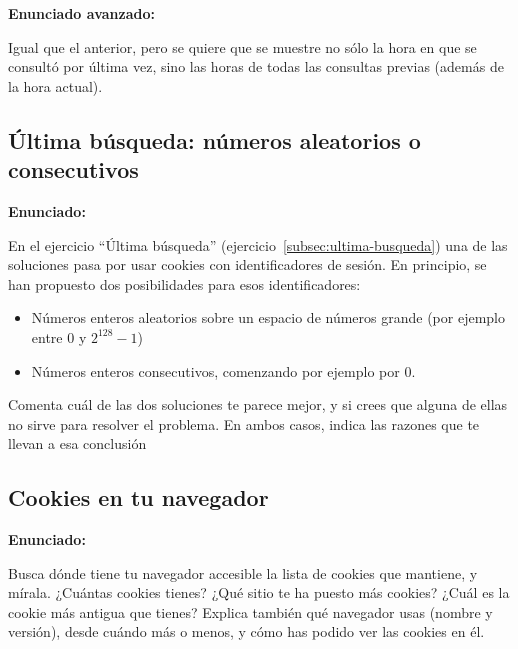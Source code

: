 \textbf{Enunciado avanzado:}

Igual que el anterior, pero se quiere que se muestre no sólo la hora en que se consultó por última vez, sino las horas de todas las consultas previas (además de la hora actual).

\subsection{Última búsqueda: números aleatorios o consecutivos}
\label{subsec:ultima-busqueda-aleconsec}

\textbf{Enunciado:}

En el ejercicio ``Última búsqueda'' (ejercicio~\ref{subsec:ultima-busqueda}) una de las soluciones pasa por usar cookies con identificadores de sesión. En principio, se han propuesto dos posibilidades para esos identificadores:

\begin{itemize}
\item Números enteros aleatorios sobre un espacio de números grande (por ejemplo entre 0 y $2^{128}-1$)
\item Números enteros consecutivos, comenzando por ejemplo por 0.
\end{itemize}

Comenta cuál de las dos soluciones te parece mejor, y si crees que alguna de ellas no sirve para resolver el problema. En ambos casos, indica las razones que te llevan a esa conclusión


\subsection{Cookies en tu navegador}
\label{subsec:cookies-navegador}

\textbf{Enunciado:}

Busca dónde tiene tu navegador accesible la lista de cookies que mantiene, y mírala. ¿Cuántas cookies tienes? ¿Qué sitio te ha puesto más cookies? ¿Cuál es la cookie más antigua que tienes? Explica también qué navegador usas (nombre y versión), desde cuándo más o menos, y cómo has podido ver las cookies en él.


